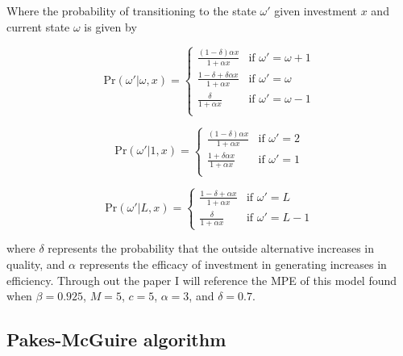 \documentclass[12pt]{article}
\begin{document}
Where the probability of transitioning to the state $\omega'$ given investment $x$ and current state $\omega$ is given by

\begin{equation*}
  \text{Pr}(\omega'|\omega,x) =
  \begin{cases}
    \frac{(1-\delta) \alpha x}{1+\alpha x} & \text{if } \omega'=\omega+1\\
    \frac{1-\delta+\delta \alpha x}{1+\alpha x} & \text{if } \omega' = \omega\\
    \frac{\delta}{1+\alpha x} & \text{if } \omega' = \omega-1\\
  \end{cases}
\end{equation*}

\begin{equation*}
  \text{Pr}(\omega'|1,x) =
  \begin{cases}
    \frac{(1-\delta) \alpha x}{1+\alpha x} & \text{if } \omega'=2\\
    \frac{1+\delta \alpha x}{1+\alpha x} & \text{if } \omega'=1\\
  \end{cases}
\end{equation*}

\begin{equation*}
  \text{Pr}(\omega'|L,x) =
  \begin{cases}
    \frac{1-\delta+\alpha x}{1+\alpha x} & \text{if } \omega'=L\\
    \frac{\delta}{1+\alpha x} & \text{if } \omega'=L-1
  \end{cases}
\end{equation*}

where $\delta$ represents the probability that the outside alternative increases in quality, and $\alpha$ represents the efficacy of investment in generating increases in efficiency. Through out the paper I will reference the MPE of this model found when $\beta=0.925$, $M=5$, $c=5$, $\alpha=3$, and $\delta=0.7$.

\subsection{Pakes-McGuire algorithm}

\end{document}
